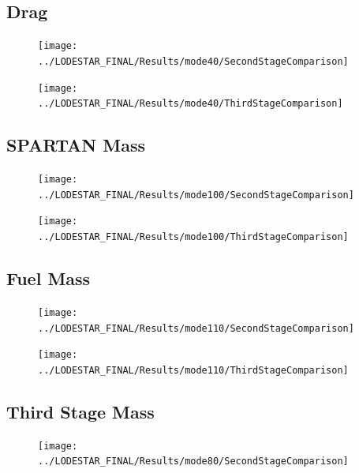 \subsection{Drag}

\begin{figure}[!th]
\centering
\texttt{[image: ../LODESTAR\_FINAL/Results/mode40/SecondStageComparison]}
\caption{}
\label{fig:SecondStageComparison3}
\end{figure}

\begin{figure}[!th]
\centering
\texttt{[image: ../LODESTAR\_FINAL/Results/mode40/ThirdStageComparison]}
\caption{}
\label{fig:ThirdStageComparison3}
\end{figure}
\FloatBarrier
\subsection{SPARTAN Mass}

\begin{figure}[th]
\centering
\texttt{[image: ../LODESTAR\_FINAL/Results/mode100/SecondStageComparison]}
\caption{}
\label{fig:SecondStageComparison4}
\end{figure}

\begin{figure}[th]
\centering
\texttt{[image: ../LODESTAR\_FINAL/Results/mode100/ThirdStageComparison]}
\caption{}
\label{fig:ThirdStageComparison4}
\end{figure}
\FloatBarrier
\subsection{Fuel Mass}
\begin{figure}[th]
\centering
\texttt{[image: ../LODESTAR\_FINAL/Results/mode110/SecondStageComparison]}
\caption{}
\label{fig:SecondStageComparison5}
\end{figure}

\begin{figure}[th]
\centering
\texttt{[image: ../LODESTAR\_FINAL/Results/mode110/ThirdStageComparison]}
\caption{}
\label{fig:ThirdStageComparison5}
\end{figure}
\FloatBarrier
\subsection{Third Stage Mass}

\begin{figure}[th]
\centering
\texttt{[image: ../LODESTAR\_FINAL/Results/mode80/SecondStageComparison]}
\caption{}
\label{fig:SecondStageComparison6}
\end{figure}


